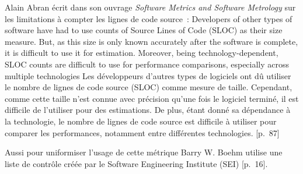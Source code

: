 {Alain Abran écrit dans son ouvrage \textit{Software Metrics and Software Metrology} sur les limitations à compter les lignes de code source~:
\quoteenfr
{Developers of other types of software have had to use counts of Source Lines of Code (SLOC) as their size measure. But, as this size is only known accurately after the software is complete, it is difficult to use it for estimation. Moreover, being technology-dependent, SLOC counts are difficult to use for performance comparisons, especially across multiple technologies}
{Les développeurs d'autres types de logiciels ont dû utiliser le nombre de lignes de code source (SLOC) comme mesure de taille. Cependant, comme cette taille n'est connue avec précision qu'une fois le logiciel terminé, il est difficile de l'utiliser pour des estimations. De plus, étant donné sa dépendance à la technologie, le nombre de lignes de code source est difficile à utiliser pour comparer les performances, notamment entre différentes technologies.}
{[p.~87]}

Aussi pour uniformiser l'usage de cette métrique Barry W. Boehm utilise une liste de contrôle créée par le Software Engineering Institute (SEI) [p.~16].
}{}

